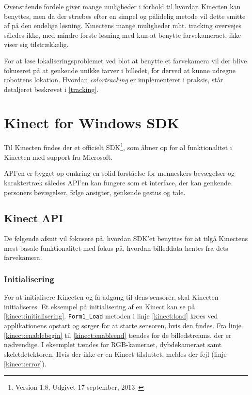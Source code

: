 Ovenstående fordele giver mange muligheder i forhold til hvordan Kinecten kan benyttes, men da der stræbes efter en simpel og pålidelig metode vil dette smitte af på den endelige løsning.
Kinectens mange muligheder mht. tracking overvejes således ikke, med mindre første løsning med kun at benytte farvekameraet, ikke viser sig tilstrækkelig.

For at løse lokaliseringsproblemet ved blot at benytte et farvekamera vil der blive fokuseret på at genkende unikke farver i billedet, for derved at kunne udregne robottens lokation.
Hvordan \textit{colortracking} er implementeret i praksis, står detaljeret beskrevet i \cref{tracking}.


\section{Kinect for Windows SDK}
Til Kinecten findes der et officielt SDK\footnote{ Version 1.8, Udgivet 17 september, 2013~\cite{kinectSDK18}}, som åbner op for al funktionalitet i Kinecten med support fra Microsoft.

API'en er bygget op omkring en solid forståelse for menneskers bevægelser og karaktertræk således API'en kan fungere som et interface, der kan genkende personers bevægelser, følge ansigter, genkende gestus og tale.

\subsection{Kinect API}\label{kinect:kinectapi}
De følgende afsnit vil fokusere på, hvordan SDK'et benyttes for at tilgå Kinectens mest basale funktionalitet med fokus på, hvordan billeddata hentes fra dets farvekamera.

\subsubsection{Initialisering}
For at initialisere Kinecten og få adgang til dens sensorer, skal Kinecten initialiseres.
Et eksempel på initialisering af en Kinect kan se på \cref{kinect:initialisering}. \lstinline[style=csharp]|Form1_Load| metoden i linje \ref{kinect:load} køres ved applikationens opstart og sørger for at starte sensoren, hvis den findes. Fra linje \ref{kinect:enablebegin} til \ref{kinect:enableend} tændes for de billedstreams, der er nødvendige. I eksemplet tændes for RGB-kameraet, dybdekameraet samt skeletdetektoren. Hvis der ikke er en Kinect tilsluttet, meldes der fejl (linje \ref{kinect:error}).

